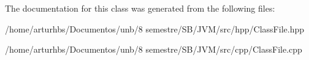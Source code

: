The documentation for this class was generated from the following files\+:\begin{DoxyCompactItemize}
\item 
/home/arturhbs/\+Documentos/unb/8 semestre/\+S\+B/\+J\+V\+M/src/hpp/Class\+File.\+hpp\item 
/home/arturhbs/\+Documentos/unb/8 semestre/\+S\+B/\+J\+V\+M/src/cpp/Class\+File.\+cpp\end{DoxyCompactItemize}
